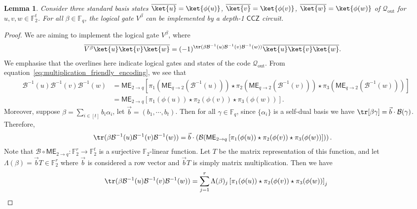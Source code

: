 \documentclass[11pt]{article}
\newtheorem{lemma}[theorem]{Lemma}
\theoremstyle{definition}
\newcommand{\CCZ}{\mathsf{CCZ}}
\newcommand{\al}{\alpha}
\newcommand{\qoutcode}{\mathcal{Q}_{\text{out}}}
\newcommand{\enc}{\phi}
\newcommand{\FF}{\mathbb{F}}
\newcommand*{\ol}{\overline}
\newcommand{\B}{\mathcal{B}}
\newcommand{\ME}{\mathsf{ME}_{q\rightarrow 2}}
\newcommand{\MEinv}{\mathsf{ME}_{2 \rightarrow q}}
\begin{document}
\begin{lemma}\label{lem:concatenation_physical}
    Consider three standard basis states $\ol{\ket{u}} = \ket{\phi(u)}$, $\ol{\ket{v}} = \ket{\phi(v)}$, $\ol{\ket{w}} = \ket{\phi(w)}$ of $\qoutcode$ for $u,v,w\in\FF_2^t$. 
    For all $\beta\in \FF_q$, the logical gate $V^\beta$ can be implemented by a depth-1 $\CCZ$ circuit.
\end{lemma}
\begin{proof}
    We are aiming to implement the logical gate $V^\beta$, where
    \begin{align}
        \ol{V^\beta\ket{u}\ket{v}\ket{w}}
        &= (-1)^{\tr(\beta\B^{-1}(u)\B^{-1}(v)\B^{-1}(w))} \ol{\ket{u}}\ol{\ket{v}}\ol{\ket{w}}.
    \end{align}
    We emphasise that the overlines here indicate logical gates and states of the code $\qoutcode$.
    From equation~\eqref{eq:multiplication_friendly_encoding}, we see that 
    \begin{align}
        \B^{-1}(u)\B^{-1}(v)\B^{-1}(w)
        &= \MEinv\left[ 
        \pi_1(\ME(\B^{-1}(u))) \star
        \pi_2(\ME(\B^{-1}(v))) \star
        \pi_3(\ME(\B^{-1}(w)))
        \right] \\
        &= \MEinv\left[ 
        \pi_1(\enc(u)) \star
        \pi_2(\enc(v)) \star
        \pi_3(\enc(w))
        \right].
    \end{align}
    Moreover, suppose $\beta = \sum_{i\in [t]} b_i\al_i$, let $\vec{b} = (b_1,\cdots, b_t)$. 
    Then for all $\gamma\in \FF_q$, since $\{\al_i\}$ is a self-dual basis we have $\tr[\beta\gamma] = \vec{b}\cdot\B(\gamma)$.
    Therefore,
    \begin{align}
        \tr(\beta \B^{-1}(u)\B^{-1}(v)\B^{-1}(w))
        &=  \vec{b}\cdot \left( \B(\MEinv\left[ 
        \pi_1(\enc(u)) \star
        \pi_2(\enc(v)) \star
        \pi_3(\enc(w))
        \right]) \right).
    \end{align}
    Note that $\B\circ \MEinv: \FF_2^r\rightarrow \FF_2^t$ is a surjective $\FF_2$-linear function. 
    Let $T$ be the matrix representation of this function, and let $\Lambda(\beta) = \vec{b}T\in \FF_2^r$ where $\vec{b}$ is considered a row vector and $\vec{b}T$ is simply matrix multiplication.
    Then we have
    \begin{align}
        \tr(\beta \B^{-1}(u)\B^{-1}(v)\B^{-1}(w))
        &=  \sum_{j=1}^r \Lambda(\beta)_j \left[ 
        \pi_1(\enc(u)) \star
        \pi_2(\enc(v)) \star
        \pi_3(\enc(w))
        \right]_j \\

\end{align}
\end{proof}
\end{document}

